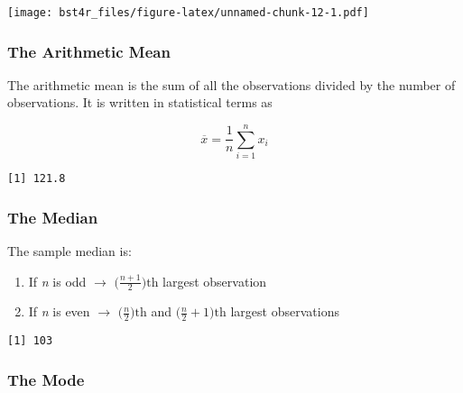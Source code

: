 \documentclass[12pt,]{article}
\newenvironment{Shaded}{\begin{snugshade}}{\end{snugshade}}
\newcommand{\KeywordTok}[1]{\textcolor[rgb]{0.13,0.29,0.53}{\textbf{#1}}}
\newcommand{\OperatorTok}[1]{\textcolor[rgb]{0.81,0.36,0.00}{\textbf{#1}}}
\newcommand{\NormalTok}[1]{#1}
\theoremstyle{definition}
\theoremstyle{definition}
\theoremstyle{definition}
\theoremstyle{remark}
\begin{document}
\texttt{[image: bst4r\_files/figure-latex/unnamed-chunk-12-1.pdf]}

\subsubsection{The Arithmetic Mean}\label{the-arithmetic-mean}

The arithmetic mean is the sum of all the observations divided by the
number of observations. It is written in statistical terms as

\[\overline{x} = \frac{1}{n}\sum^n_{i=1}x_i\]

\begin{Shaded}
\end{Shaded}

\begin{verbatim}
[1] 121.8
\end{verbatim}

\subsubsection{The Median}\label{the-median}

The sample median is:

\begin{enumerate}
\def\labelenumi{\arabic{enumi}.}
\item
  If \emph{n} is odd \(\rightarrow\)
  \(\Big(\frac{n+1}{2}\Big)\text{th}\) largest observation
\item
  If \emph{n} is even \(\rightarrow\) \(\Big(\frac{n}{2}\Big)\text{th}\)
  and \(\Big(\frac{n}{2}+1\Big)\text{th}\) largest observations
\end{enumerate}

\begin{Shaded}
\end{Shaded}

\begin{verbatim}
[1] 103
\end{verbatim}

\subsubsection{The Mode}\label{the-mode}
\end{document}
